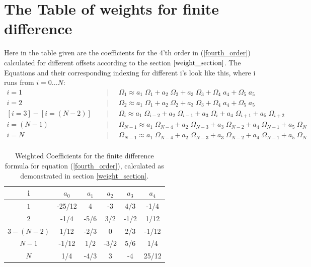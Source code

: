 \chapter{The Table of weights for finite difference}
Here in the table given are the coefficients for the 4'th order in (\ref{fourth_order}) calculated for different offsets according to the section $\ref{weight_section}$. The Equations and their corresponding indexing for different i's look like this, where i runs from $i =0...N$:
\begin{align}
    i = 1\;\;\;\;\;&|\;\;\;\;\; \Omega_1 \approx  a_1\; \Omega_1 + a_2 \;\Omega_2 + a_3 \;\Omega_3 + \Omega_4 \;a_4 + \Omega_5\; a_5\\
    i = 2\;\;\;\;\;&|\;\;\;\;\; \Omega_2 \approx  a_1\; \Omega_1 + a_2 \;\Omega_2 + a_3\; \Omega_3 + \Omega_4 \;a_4 + \Omega_5 \;a_5\\
    [i=3] - [i = (N-2)]\;\;\;\;\;&|\;\;\;\;\; \Omega_i \approx  a_1\; \Omega_{i-2} + a_2\; \Omega_{i-1} + a_3\; \Omega_i +a_4 \; \Omega_{i+1} + a_5 \;\Omega_{i+2} \\
    i = (N-1)\;\;\;\;\;&|\;\;\;\;\; \Omega_{N-1} \approx  a_1\; \Omega_{N-4} + a_2\; \Omega_{N-3} + a_3\; \Omega_{N-2} +a_4 \; \Omega_{N-1} + a_5 \;\Omega_{N} \\
    i = N\;\;\;\;\;&|\;\;\;\;\; \Omega_{N-1} \approx  a_1\; \Omega_{N-4} + a_2\; \Omega_{N-3} + a_3\; \Omega_{N-2} +a_4 \; \Omega_{N-1} + a_5 \;\Omega_{N} \\
\end{align}


\begin{table}[h!]
    \centering
    \begin{tabular}{c|c|c|c|c|c}
$\mathbf{i}$    & $a_0$ & $a_1$ & $a_2$ & $a_3$ & $a_4$    \\ \hline
      $1$       &  -25/12& 4& -3& 4/3& -1/4 \\ \hline
      $2$       &  -1/4& -5/6& 3/2& -1/2& 1/12\\ \hline
      $3-(N-2)$ &  1/12&-2/3& 0&2/3& -1/12  \\ \hline
      $N-1$     &   -1/12& 1/2& -3/2& 5/6& 1/4\\ \hline
      $N$       &  1/4& -4/3& 3& -4& 25/12\\ \hline
      
    \end{tabular}
    \caption{Weighted Coefficients for the finite difference formula for equation (\ref{fourth_order}), calculated as demonstrated in section \ref{weight_section}. }
    \label{coefficient_table}
\end{table}
